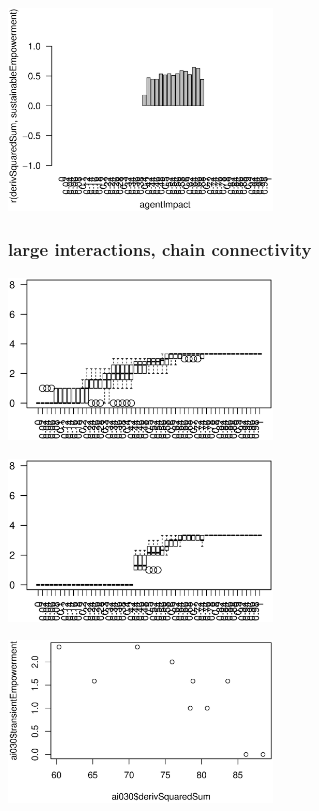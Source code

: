 \documentclass[conference]{IEEEtran}
\begin{document}
\centerline{\includegraphics[width=7cm]{n08_chain_small_corr_dss_empsust.eps}}


\pagebreak


\subsubsection{large interactions, chain connectivity}

\rule{0pt}{0pt}

\centerline{\includegraphics[width=7cm]{n08_chain_large_emp.eps}}

\centerline{\includegraphics[width=7cm]{n08_chain_large_empsust.eps}}

\centerline{\includegraphics[width=7cm]{n08_chain_large_corr_dss_emp_ai030.eps}}
\end{document}
